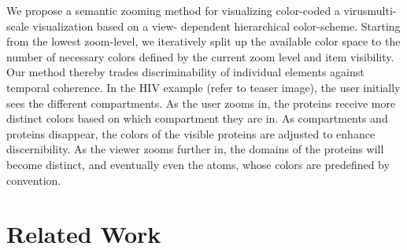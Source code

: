 \documentclass[journal]{vgtc}                %
\begin{document}
We propose a semantic zooming method for visualizing color-coded a virusmulti-scale visualization based on a view- dependent hierarchical color-scheme. Starting from the lowest zoom-level, we iteratively split up the available color space to the number of necessary colors defined by the current zoom level and item visibility. Our method thereby trades discriminability of individual elements against temporal coherence. In the HIV example (refer to teaser image), the user initially sees the different compartments. As the user zooms in, the proteins receive more distinct colors based on which compartment they are in. As compartments and proteins disappear, the colors of the visible proteins are adjusted to enhance discernibility.  As the viewer zooms further in, the domains of the proteins will become distinct, and eventually even the atoms, whose colors are predefined by convention. 



\section{Related Work}
\end{document}
